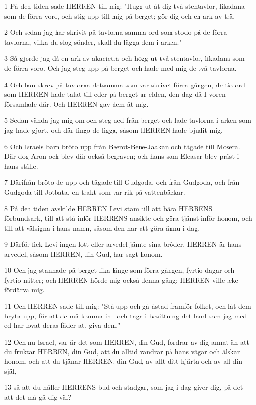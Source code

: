 \par 1 På den tiden sade HERREN till mig: "Hugg ut åt dig två stentavlor, likadana som de förra voro, och stig upp till mig på berget; gör dig och en ark av trä.
\par 2 Och sedan jag har skrivit på tavlorna samma ord som stodo på de förra tavlorna, vilka du slog sönder, skall du lägga dem i arken."
\par 3 Så gjorde jag då en ark av akacieträ och högg ut två stentavlor, likadana som de förra voro. Och jag steg upp på berget och hade med mig de två tavlorna.
\par 4 Och han skrev på tavlorna detsamma som var skrivet förra gången, de tio ord som HERREN hade talat till eder på berget ur elden, den dag då I voren församlade där. Och HERREN gav dem åt mig.
\par 5 Sedan vända jag mig om och steg ned från berget och lade tavlorna i arken som jag hade gjort, och där fingo de ligga, såsom HERREN hade bjudit mig.
\par 6 Och Israels barn bröto upp från Beerot-Bene-Jaakan och tågade till Mosera. Där dog Aron och blev där också begraven; och hans som Eleasar blev präst i hans ställe.
\par 7 Därifrån bröto de upp och tågade till Gudgoda, och från Gudgoda, och från Gudgoda till Jotbata, en trakt som var rik på vattenbäckar.
\par 8 På den tiden avskilde HERREN Levi stam till att bära HERRENS förbundsark, till att stå inför HERRENS ansikte och göra tjänst inför honom, och till att välsigna i hans namn, såsom den har att göra ännu i dag.
\par 9 Därför fick Levi ingen lott eller arvedel jämte sina bröder. HERREN är hans arvedel, såsom HERREN, din Gud, har sagt honom.
\par 10 Och jag stannade på berget lika länge som förra gången, fyrtio dagar och fyrtio nätter; och HERREN hörde mig också denna gång: HERREN ville icke fördärva mig.
\par 11 Och HERREN sade till mig: "Stå upp och gå åstad framför folket, och låt dem bryta upp, för att de må komma in i och taga i besittning det land som jag med ed har lovat deras fäder att giva dem."
\par 12 Och nu Israel, var är det som HERREN, din Gud, fordrar av dig annat än att du fruktar HERREN, din Gud, att du alltid vandrar på hans vägar och älskar honom, och att du tjänar HERREN, din Gud, av allt ditt hjärta och av all din själ,
\par 13 så att du håller HERRENS bud och stadgar, som jag i dag giver dig, på det att det må gå dig väl?
